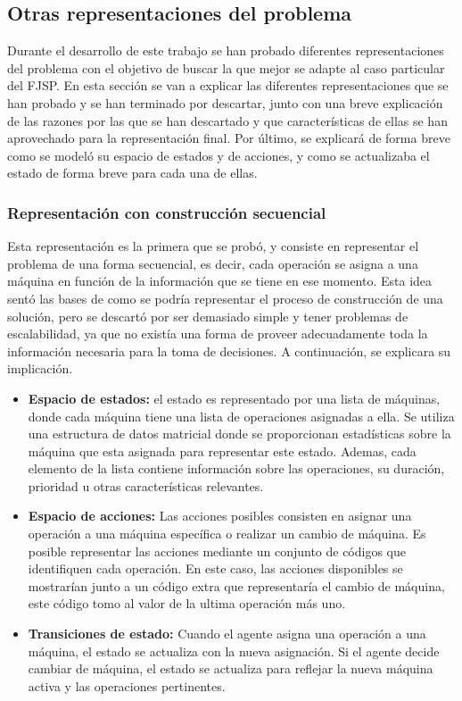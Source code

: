 \subsection{Otras representaciones del problema}
Durante el desarrollo de este trabajo se han probado diferentes representaciones
del problema con el objetivo de buscar la que mejor se adapte al caso particular del FJSP. En
esta sección se van a explicar las diferentes representaciones que se han probado
y se han terminado por descartar, junto con una breve explicación de las razones
por las que se han descartado y que características de ellas se han aprovechado
para la representación final. Por último, se explicará de forma breve como se
modeló su espacio de estados y de acciones, y como se actualizaba el estado
de forma breve para cada una de ellas. 

\subsubsection{Representación con construcción secuencial}
Esta representación es la primera que se probó, y consiste en representar el
problema de una forma secuencial, es decir, cada operación se asigna a una máquina
en función de la información que se tiene en ese momento. Esta idea 
sentó las bases de como se podría representar el proceso de construcción de una
solución, pero se descartó por ser demasiado simple y tener problemas de escalabilidad,
ya que no existía una forma de proveer adecuadamente toda la información necesaria
para la toma de decisiones. A continuación, se explicara su implicación.

\begin{itemize}
    \item \textbf{Espacio de estados:} el estado es representado por una 
    lista de máquinas, donde cada máquina tiene una lista de operaciones asignadas
    a ella. Se utiliza una estructura de datos matricial donde se proporcionan estadísticas 
    sobre la máquina que esta asignada para representar este estado. Ademas, cada elemento de la lista 
    contiene información sobre las operaciones, su duración, prioridad u otras características relevantes.
    \item \textbf{Espacio de acciones:} Las acciones posibles consisten en asignar una operación 
    a una máquina específica o realizar un cambio de máquina. Es posible representar las acciones 
    mediante un conjunto de códigos que identifiquen cada operación. En este caso, las acciones
    disponibles se mostrarían junto a un código extra que representaría el cambio de máquina, este código
    tomo al valor de la ultima operación más uno.
    \item \textbf{Transiciones de estado:} Cuando el agente asigna una operación a una máquina, 
    el estado se actualiza con la nueva asignación. Si el agente decide cambiar de máquina, 
    el estado se actualiza para reflejar la nueva máquina activa y las operaciones pertinentes.
\end{itemize}

